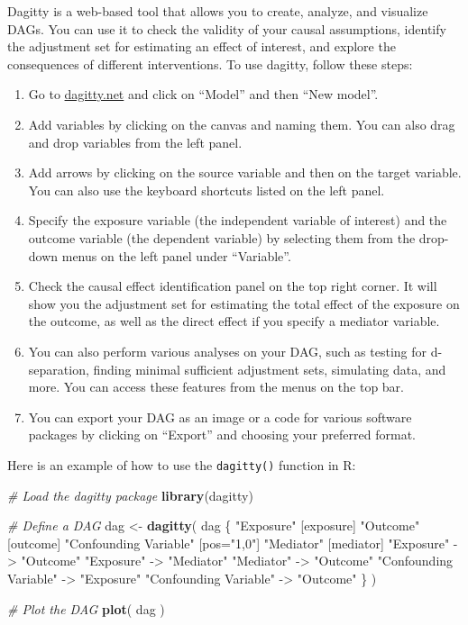 \documentclass[
]{book}
\newenvironment{Shaded}{\begin{snugshade}}{\end{snugshade}}
\newcommand{\CommentTok}[1]{\textcolor[rgb]{0.56,0.35,0.01}{\textit{#1}}}
\newcommand{\FunctionTok}[1]{\textcolor[rgb]{0.13,0.29,0.53}{\textbf{#1}}}
\newcommand{\NormalTok}[1]{#1}
\newcommand{\OtherTok}[1]{\textcolor[rgb]{0.56,0.35,0.01}{#1}}
\newcommand{\StringTok}[1]{\textcolor[rgb]{0.31,0.60,0.02}{#1}}
\providecommand{\tightlist}{%
  \setlength{\itemsep}{0pt}\setlength{\parskip}{0pt}}
\begin{document}
Dagitty is a web-based tool that allows you to create, analyze, and visualize DAGs. You can use it to check the validity of your causal assumptions, identify the adjustment set for estimating an effect of interest, and explore the consequences of different interventions. To use dagitty, follow these steps:

\begin{enumerate}
\def\labelenumi{\arabic{enumi}.}
\tightlist
\item
  Go to \href{https://dagitty.net}{dagitty.net} and click on ``Model'' and then ``New model''.
\item
  Add variables by clicking on the canvas and naming them. You can also drag and drop variables from the left panel.
\item
  Add arrows by clicking on the source variable and then on the target variable. You can also use the keyboard shortcuts listed on the left panel.
\item
  Specify the exposure variable (the independent variable of interest) and the outcome variable (the dependent variable) by selecting them from the drop-down menus on the left panel under ``Variable''.
\item
  Check the causal effect identification panel on the top right corner. It will show you the adjustment set for estimating the total effect of the exposure on the outcome, as well as the direct effect if you specify a mediator variable.
\item
  You can also perform various analyses on your DAG, such as testing for d-separation, finding minimal sufficient adjustment sets, simulating data, and more. You can access these features from the menus on the top bar.
\item
  You can export your DAG as an image or a code for various software packages by clicking on ``Export'' and choosing your preferred format.
\end{enumerate}

Here is an example of how to use the \texttt{dagitty()} function in R:

\begin{Shaded}
\begin{Highlighting}[]
\CommentTok{\# Load the dagitty package}
\FunctionTok{library}\NormalTok{(dagitty)}

\CommentTok{\# Define a DAG}
\NormalTok{dag }\OtherTok{\textless{}{-}} \FunctionTok{dagitty}\NormalTok{( }\StringTok{\textquotesingle{}dag \{}
\StringTok{  "Exposure" [exposure]}
\StringTok{  "Outcome" [outcome]}
\StringTok{  "Confounding Variable" [pos="1,0"]}
\StringTok{  "Mediator" [mediator]}
\StringTok{  "Exposure" {-}\textgreater{} "Outcome"}
\StringTok{  "Exposure" {-}\textgreater{} "Mediator"}
\StringTok{  "Mediator" {-}\textgreater{} "Outcome"}
\StringTok{  "Confounding Variable" {-}\textgreater{} "Exposure"}
\StringTok{  "Confounding Variable" {-}\textgreater{} "Outcome"}
\StringTok{\}\textquotesingle{}}\NormalTok{ )}

\CommentTok{\# Plot the DAG}
\FunctionTok{plot}\NormalTok{( dag )}
\end{Highlighting}
\end{Shaded}
\end{document}
